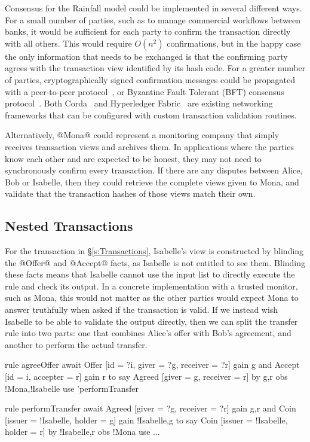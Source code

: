 Consensus for the Rainfall model could be implemented in several different ways. For a small number of parties, such as to manage commercial workflows between banks, it would be sufficient for each party to confirm the transaction directly with all others. This would require $O(n^2)$ confirmations, but in the happy case the only information that needs to be exchanged is that the confirming party agrees with the transaction view identified by its hash code. For a greater number of parties, cryptographically signed confirmation messages could be propagated with a peer-to-peer protocol~\cite{El-Ansary2003:Broadcast}, or Byzantine Fault Tolerant (BFT) consensus protocol~\cite{Lamport1982:Byzantine, Ongaro2014:Consensus, Gilad2017:Algorand}. Both Corda~\cite{Hearn2016:Corda} and Hyperledger Fabric~\cite{Androulaki2018:Fabric} are existing networking frameworks that can be configured with custom transaction validation routines.

Alternatively, @Mona@ could represent a monitoring company that simply receives transaction views and archives them. In applications where the parties know each other and are expected to be honest, they may not need to synchronously confirm every transaction. If there are any disputes between Alice, Bob or Isabelle, then they could retrieve the complete views given to Mona, and validate that the transaction hashes of those views match their own.

\eject{}
\subsection{Nested Transactions}
\label{s:NestedTransactions}
For the transaction in \S\ref{s:Transactions}, Isabelle's view is constructed by blinding the @Offer@ and @Accept@ facts, as Isabelle is not entitled to see them. Blinding these facts means that Isabelle cannot use the input list to directly execute the rule and check its output. In a concrete implementation with a trusted monitor, such as Mona, this would not matter as the other parties would expect Mona to answer truthfully when asked if the transaction is valid. If we instead wish Isabelle to be able to validate the output directly, then we can split the transfer rule into two parts: one that combines Alice's offer with Bob's agreement, and another to perform the actual transfer.

\begin{small}
\begin{code}
  rule  agreeOffer
  await Offer  [id = ?i, giver = ?g, receiver = ?r] gain {g}
    and Accept [id = i,  accepter = r]              gain {r}
  to
    say Agreed [giver = g, receiver = r]
     by {g,r}  obs {!Mona,!Isabelle} use {'performTransfer}

  rule  performTransfer
  await Agreed [giver = ?g, receiver = ?r]        gain {g,r}
   and  Coin   [issuer = !Isabelle, holder = g]
        gain {!Isabelle,g}
  to
    say Coin   [issuer = !Isabelle, holder = r]
     by {!Isabelle,r} obs {!Mona} use ...
\end{code}
\end{small}

